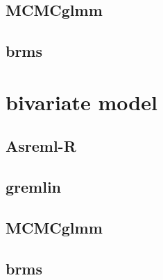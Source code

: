 \documentclass[12pt,]{book}
\begin{document}
\hypertarget{mcmcglmm-4}{%
\subsection{MCMCglmm}\label{mcmcglmm-4}}

\hypertarget{brms-4}{%
\subsection{brms}\label{brms-4}}

\hypertarget{bivariate-model}{%
\section{bivariate model}\label{bivariate-model}}

\hypertarget{asreml-r-4}{%
\subsection{Asreml-R}\label{asreml-r-4}}

\hypertarget{gremlin-5}{%
\subsection{gremlin}\label{gremlin-5}}

\hypertarget{mcmcglmm-5}{%
\subsection{MCMCglmm}\label{mcmcglmm-5}}

\hypertarget{brms-5}{%
\subsection{brms}\label{brms-5}}



\printindex
\end{document}
